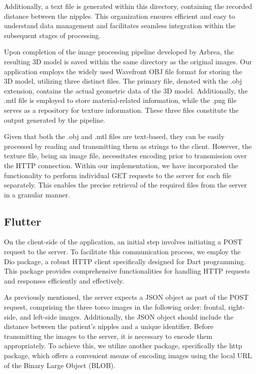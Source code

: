 Additionally, a text file is generated within this directory, containing the recorded distance between the nipples. 
This organization ensures efficient and easy to understand data management and facilitates seamless integration within the subsequent stages of processing.

Upon completion of the image processing pipeline developed by Arbrea, the resulting 3D model is saved within the same directory as the original images. 
Our application employs the widely used Wavefront OBJ file format for storing the 3D model, utilizing three distinct files. The primary file, 
denoted with the .obj extension, contains the actual geometric data of the 3D model. Additionally, the .mtl file is employed to store material-related information, 
while the .png file serves as a repository for texture information. These three files constitute the output generated by the pipeline.

Given that both the .obj and .mtl files are text-based, they can be easily processed by reading and transmitting them as strings to the client. 
However, the texture file, being an image file, necessitates encoding prior to transmission over the HTTP connection. Within our implementation, 
we have incorporated the functionality to perform individual GET requests to the server for each file separately. This enables the 
precise retrieval of the required files from the server in a granular manner. 

\subsection{Flutter}

On the client-side of the application, an initial step involves initiating a POST request to the server. To facilitate this communication process, 
we employ the Dio package, a robust HTTP client specifically designed for Dart programming. This package provides comprehensive functionalities for 
handling HTTP requests and responses efficiently and effectively.

As previously mentioned, the server expects a JSON object as part of the POST request, comprising the three torso images in the following order: 
frontal, right-side, and left-side images. Additionally, the JSON object should include the distance between the patient's nipples and a unique identifier. 
Before transmitting the images to the server, it is necessary to encode them appropriately. To achieve this, we utilize another package, 
specifically the http package, which offers a convenient means of encoding images using the local URL of the Binary Large Object (BLOB).

